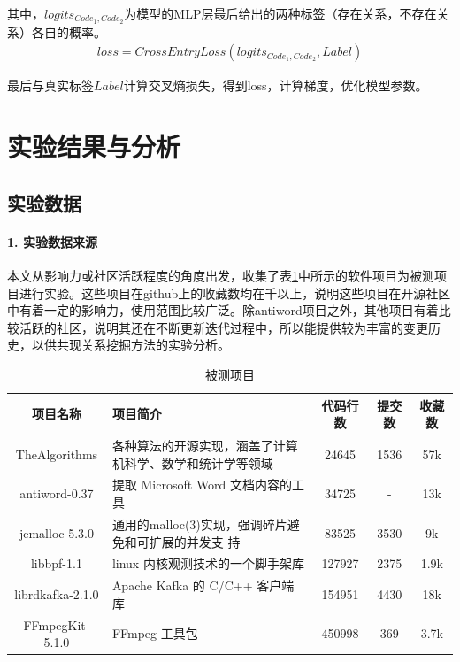 其中，$logits_{Code_1,Code_2}$为模型的MLP层最后给出的两种标签（存在关系，不存在关系）各自的概率。
\begin{align}
loss=CrossEntryLoss(logits_{Code_1,Code_2}, Label)
\end{align}

最后与真实标签$Label$计算交叉熵损失，得到loss，计算梯度，优化模型参数。


\section{实验结果与分析}

\subsection{实验数据}

\paragraph{1. 实验数据来源}

本文从影响力或社区活跃程度的角度出发，收集了表\ref{1_data_from}中所示的软件项目为被测项目进行实验。这些项目在github上的收藏数均在千以上，说明这些项目在开源社区中有着一定的影响力，使用范围比较广泛。除antiword项目之外，其他项目有着比较活跃的社区，说明其还在不断更新迭代过程中，所以能提供较为丰富的变更历史，以供共现关系挖掘方法的实验分析。

\begin{table}[htbp]
\caption{被测项目}
\label{1_data_from}
\vspace{0.5em}\centering\wuhao
\begin{tabular}{cp{6cm}ccc}
\toprule
项目名称 & 项目简介 & 代码行数& 提交数 & 收藏数 \\
\midrule
TheAlgorithms & 各种算法的开源实现，涵盖了计算机科学、数学和统计学等领域 & 24645 & 1536 & 57k \\
antiword-0.37 & 提取 Microsoft Word 文档内容的工具 & 34725& - & 13k\\
jemalloc-5.3.0 & 通用的malloc(3)实现，强调碎片避免和可扩展的并发支
持  &83525& 3530 & 9k \\
libbpf-1.1 & linux 内核观测技术的一个脚手架库 & 127927 & 2375 & 1.9k \\
librdkafka-2.1.0& Apache Kafka 的 C/C++ 客户端库 & 154951 & 4430 & 18k \\
FFmpegKit-5.1.0 & FFmpeg 工具包 & 450998 & 369 & 3.7k \\

\bottomrule
\end{tabular}
\end{table}



